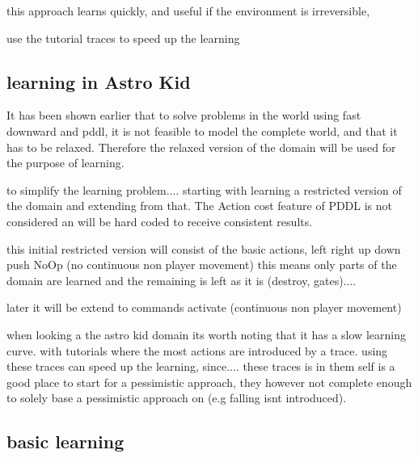 	this approach learns quickly, and useful if the environment is irreversible,
	
	

	
		
	use the tutorial traces to speed up the learning
		
	
	\subsection{learning in Astro Kid}
	It has been shown earlier that to solve problems in the world using fast downward and pddl, it is not feasible to model the complete world, and that it has to be relaxed. Therefore the relaxed version of the domain will be used for the purpose of learning.
	
	
	to simplify the learning problem.... starting with learning a restricted version of the domain and extending from that. The Action cost feature of PDDL is not considered an will be hard coded to receive consistent results.
	
	this initial restricted version will consist of the basic actions, left right up down push NoOp  (no continuous non player movement)
	this means only parts of the domain are learned and the remaining is left as it is (destroy, gates)....



	later it will be extend to commands activate  (continuous non player movement)
	
	
	
	when looking a the astro kid domain its worth noting that it has a slow learning curve. with tutorials where the most actions are introduced by a trace.  using these traces can speed up the learning, since.... these traces is in them self is a good place to start for a pessimistic approach, they however not complete enough to solely base a pessimistic approach on (e.g falling isnt introduced).




\subsection{basic learning}
		
